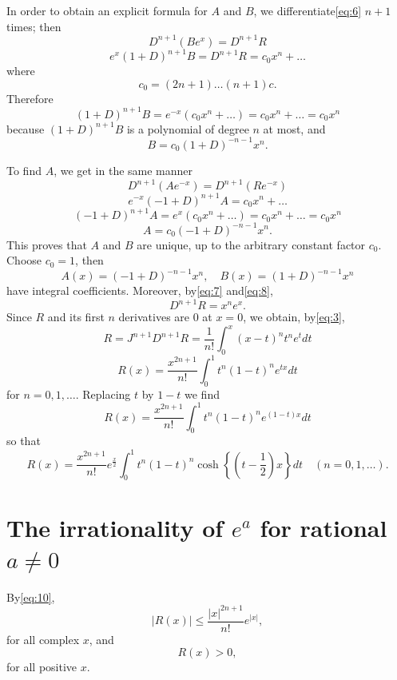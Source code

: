In order to obtain an explicit formula for $A$ and $B$, we differentiate\eqref{eq:6} $n+1$ times; then
\[ D^{n+1}(B e^x) = D^{n+1}R \]
\begin{equation} e^x(1+D)^{n+1}B = D^{n+1}R = c_0 x^n + \dots \tag{7}\label{eq:7} \end{equation}
where
\[ c_0 = (2n+1) \dots (n+1)c. \]
Therefore
\begin{equation} (1+D)^{n+1}B = e^{-x}(c_0 x^n + \dots) = c_0 x^n + \dots = c_0 x^n \tag{8}\label{eq:8} \end{equation}
because $(1+D)^{n+1}B$ is a polynomial of degree $n$ at most, and
\[ B = c_0(1+D)^{-n-1}x^n. \]

To find $A$, we get in the same manner
\[ D^{n+1}(A e^{-x}) = D^{n+1}(R e^{-x}) \]
\[ e^{-x}(-1+D)^{n+1}A = c_0 x^n + \dots \]
\[ (-1+D)^{n+1}A = e^x(c_0 x^n + \dots) = c_0 x^n + \dots = c_0 x^n \]
\[ A = c_0(-1+D)^{-n-1}x^n. \]
This proves that $A$ and $B$ are unique, up to the arbitrary constant factor $c_0$. Choose $c_0 = 1$, then
\begin{equation} A(x) = (-1+D)^{-n-1}x^n, \quad B(x) = (1+D)^{-n-1}x^n \tag{9}\label{eq:9} \end{equation}
have integral coefficients. Moreover, by\eqref{eq:7} and\eqref{eq:8},
\[ D^{n+1}R = x^n e^x. \]
Since $R$ and its first $n$ derivatives are $0$ at $x = 0$, we obtain, by\eqref{eq:3},
\[ R = J^{n+1}D^{n+1}R = \frac{1}{n!} \int_{0}^{x} (x-t)^{n}t^{n}e^{t}dt \]
\begin{equation} R(x) = \frac{x^{2n+1}}{n!} \int_0^1 t^n (1-t)^n e^{tx} dt \tag{10}\label{eq:10} \end{equation}
for $n=0,1,\dots$. Replacing $t$ by $1-t$ we find
\[ R(x) = \frac{x^{2n+1}}{n!} \int_0^1 t^n (1-t)^n e^{(1-t)x} dt \]
so that
\begin{equation} R(x) = \frac{x^{2n+1}}{n!} e^{\frac{x}{2}} \int_{0}^{1} t^{n} (1-t)^{n} \cosh\left\{\left(t-\frac{1}{2}\right)x\right\} dt \quad (n = 0, 1, \dots). \tag{11}\label{eq:11} \end{equation}

\section{The irrationality of $e^a$ for rational $a \neq 0$}

By\eqref{eq:10},
\begin{equation} |R(x)| \leq \frac{|x|^{2n+1}}{n!} e^{|x|}, \tag{12}\label{eq:12} \end{equation}
for all complex $x$, and
\begin{equation} R(x) > 0, \tag{13}\label{eq:13} \end{equation}
for all positive $x$.

